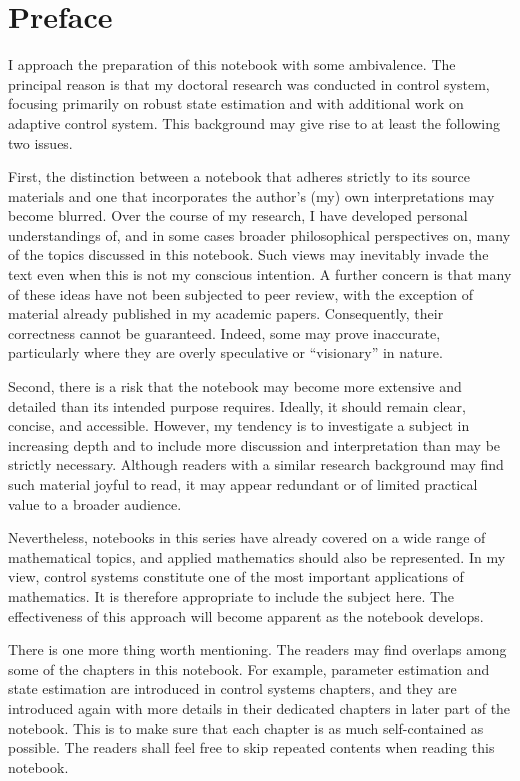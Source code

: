 \chapter*{Preface}

I approach the preparation of this notebook with some ambivalence. The principal reason is that my doctoral research was conducted in control system, focusing primarily on robust state estimation and with additional work on adaptive control system. This background may give rise to at least the following two issues.

First, the distinction between a notebook that adheres strictly to its source materials and one that incorporates the author's (my) own interpretations may become blurred. Over the course of my research, I have developed personal understandings of, and in some cases broader philosophical perspectives on, many of the topics discussed in this notebook. Such views may inevitably invade the text even when this is not my conscious intention. A further concern is that many of these ideas have not been subjected to peer review, with the exception of material already published in my academic papers. Consequently, their correctness cannot be guaranteed. Indeed, some may prove inaccurate, particularly where they are overly speculative or ``visionary'' in nature.

Second, there is a risk that the notebook may become more extensive and detailed than its intended purpose requires. Ideally, it should remain clear, concise, and accessible. However, my tendency is to investigate a subject in increasing depth and to include more discussion and interpretation than may be strictly necessary. Although readers with a similar research background may find such material joyful to read, it may appear redundant or of limited practical value to a broader audience.

Nevertheless, notebooks in this series have already covered on a wide range of mathematical topics, and applied mathematics should also be represented. In my view, control systems constitute one of the most important applications of mathematics. It is therefore appropriate to include the subject here. The effectiveness of this approach will become apparent as the notebook develops.

There is one more thing worth mentioning. The readers may find overlaps among some of the chapters in this notebook. For example, parameter estimation and state estimation are introduced in control systems chapters, and they are introduced again with more details in their dedicated chapters in later part of the notebook. This is to make sure that each chapter is as much self-contained as possible. The readers shall feel free to skip repeated contents when reading this notebook.

